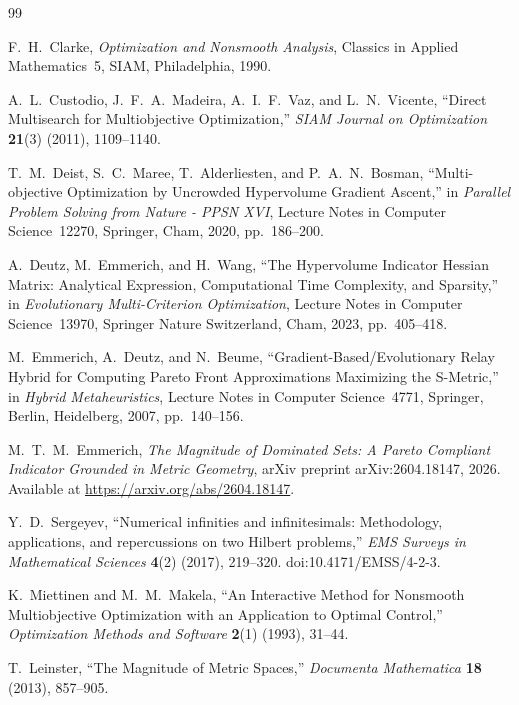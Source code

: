 \documentclass{article}
\begin{document}
\begin{thebibliography}{99}

F.~H.~Clarke,
\emph{Optimization and Nonsmooth Analysis},
Classics in Applied Mathematics~5, SIAM, Philadelphia, 1990.

A.~L.~Custodio, J.~F.~A.~Madeira, A.~I.~F.~Vaz, and L.~N.~Vicente,
``Direct Multisearch for Multiobjective Optimization,''
\emph{SIAM Journal on Optimization} \textbf{21}(3) (2011), 1109--1140.

T.~M.~Deist, S.~C.~Maree, T.~Alderliesten, and P.~A.~N.~Bosman,
``Multi-objective Optimization by Uncrowded Hypervolume Gradient Ascent,''
in \emph{Parallel Problem Solving from Nature - PPSN XVI},
Lecture Notes in Computer Science~12270, Springer, Cham, 2020, pp.~186--200.

A.~Deutz, M.~Emmerich, and H.~Wang,
``The Hypervolume Indicator Hessian Matrix: Analytical Expression, Computational Time Complexity, and Sparsity,''
in \emph{Evolutionary Multi-Criterion Optimization},
Lecture Notes in Computer Science~13970, Springer Nature Switzerland, Cham, 2023, pp.~405--418.

M.~Emmerich, A.~Deutz, and N.~Beume,
``Gradient-Based/Evolutionary Relay Hybrid for Computing Pareto Front Approximations Maximizing the S-Metric,''
in \emph{Hybrid Metaheuristics},
Lecture Notes in Computer Science~4771, Springer, Berlin, Heidelberg, 2007, pp.~140--156.

M.~T.~M.~Emmerich,
\emph{The Magnitude of Dominated Sets: A Pareto Compliant Indicator Grounded in Metric Geometry},
arXiv preprint arXiv:2604.18147, 2026. Available at \url{https://arxiv.org/abs/2604.18147}.

Y.~D.~Sergeyev,
``Numerical infinities and infinitesimals: Methodology, applications, and repercussions on two Hilbert problems,''
\emph{EMS Surveys in Mathematical Sciences} \textbf{4}(2) (2017), 219--320. doi:10.4171/EMSS/4-2-3.

K.~Miettinen and M.~M.~Makela,
``An Interactive Method for Nonsmooth Multiobjective Optimization with an Application to Optimal Control,''
\emph{Optimization Methods and Software} \textbf{2}(1) (1993), 31--44.

T.~Leinster,
``The Magnitude of Metric Spaces,''
\emph{Documenta Mathematica} \textbf{18} (2013), 857--905.


\end{thebibliography}
\end{document}
